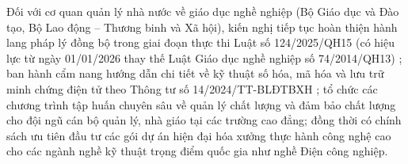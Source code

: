 Đối với cơ quan quản lý nhà nước về giáo dục nghề nghiệp (Bộ Giáo dục và Đào tạo, Bộ Lao động -- Thương binh và Xã hội), kiến nghị tiếp tục hoàn thiện hành lang pháp lý đồng bộ trong giai đoạn thực thi Luật số 124/2025/QH15 (có hiệu lực từ ngày 01/01/2026 thay thế Luật Giáo dục nghề nghiệp số 74/2014/QH13) \parencite{luatgdnn2025}; ban hành cẩm nang hướng dẫn chi tiết về kỹ thuật số hóa, mã hóa và lưu trữ minh chứng điện tử theo Thông tư số 14/2024/TT-BLĐTBXH \parencite{bldtbxh2024}; tổ chức các chương trình tập huấn chuyên sâu về quản lý chất lượng và đảm bảo chất lượng cho đội ngũ cán bộ quản lý, nhà giáo tại các trường cao đẳng; đồng thời có chính sách ưu tiên đầu tư các gói dự án hiện đại hóa xưởng thực hành công nghệ cao cho các ngành nghề kỹ thuật trọng điểm quốc gia như nghề Điện công nghiệp.
